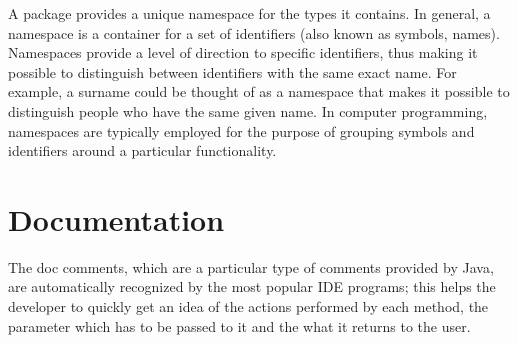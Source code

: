 A package provides a unique namespace for the types it contains.
In general, a namespace is a container for a set of identifiers (also known as symbols, names). Namespaces provide a level of direction to specific identifiers, thus making it possible to distinguish between identifiers with the same exact name. For example, a surname could be thought of as a namespace that makes it possible to distinguish people who have the same given name. In computer programming, namespaces are typically employed for the purpose of grouping symbols and identifiers around a particular functionality.

\section{Documentation}
The doc comments, which are a particular type of comments provided by Java, are automatically recognized by the most popular IDE programs; this helps the developer to quickly get an idea of the actions performed by each method, the parameter which has to be passed to it and the what it returns to the user.

%
